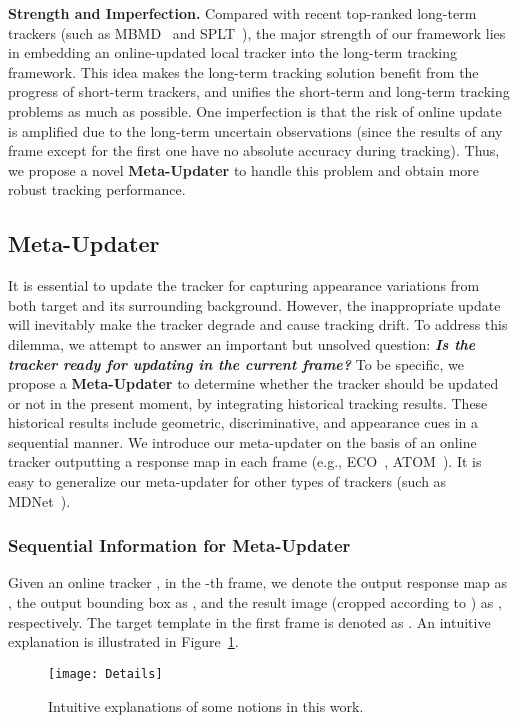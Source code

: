 \documentclass[10pt,twocolumn,letterpaper]{article}
\begin{document}
\noindent \textbf{Strength and Imperfection.} Compared with recent top-ranked
long-term trackers (such as MBMD~\cite{Zhang-VOT18-MBMD} and
SPLT~\cite{Yan-ICCV19-SPLT}), the major strength of our framework lies in embedding
an online-updated local tracker into the long-term tracking framework. This idea makes
the long-term tracking solution benefit from the progress of short-term trackers,
and unifies the short-term and long-term tracking problems as much as possible.
One imperfection is that the risk of online update is amplified due to the long-term
uncertain observations (since the results of any frame except for the first one have no
absolute accuracy during tracking).
Thus, we propose a novel \textbf{Meta-Updater} to handle this problem and
obtain more robust tracking performance.
\vspace{-2mm}
\subsection{Meta-Updater}
\vspace{-2mm}
It is essential to update the tracker for capturing appearance variations from both
target and its surrounding background.
However, the inappropriate update will inevitably make the tracker degrade and
cause tracking drift.
To address this dilemma, we attempt to answer an important but unsolved question:
\textbf{\emph{Is the tracker ready for updating in the current frame?}}
To be specific, we propose a \textbf{Meta-Updater} to determine whether the tracker
should be updated or not in the present moment, by integrating historical tracking results.
These historical results include geometric, discriminative, and appearance cues in a
sequential manner.
We introduce our meta-updater on the basis of an online tracker outputting a
response map in each frame (e.g., ECO~\cite{Danelljan-CVPR17-ECO},
ATOM~\cite{Danelljan-CVPR19-ATOM}).
It is easy to generalize our meta-updater for other types of trackers
(such as MDNet~\cite{Nam-CVPR16-MDNet}).

\vspace{-5mm}
\subsubsection{Sequential Information for Meta-Updater}
\label{sec-3-2-1}
\vspace{-2mm}
Given an online tracker , in the -th frame, we denote the output
response map as , the output bounding box as , and
the result image (cropped according to ) as , respectively.
The target template in the first frame is denoted as .
An intuitive explanation is illustrated in Figure~\ref{fig-intuitive}.
\vspace{-2mm}
\begin{figure}[htbp]
	\begin{center}
		\texttt{[image: Details]}
	\end{center}
	\vspace{-3mm}
	\caption{Intuitive explanations of some notions in this work.}
	\label{fig-intuitive}
	\vspace{-3mm}
\end{figure}
\end{document}
